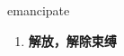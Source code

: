 
\begin{frame}
{\huge emancipate}
\begin{center}
\begin{enumerate}\Large
  \item \textbf{解放，解除束缚}
\end{enumerate}
\end{center}
\end{frame}
